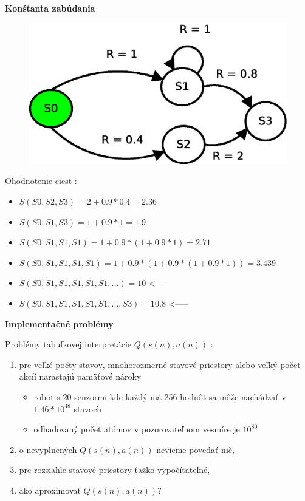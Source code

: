 \documentclass[xcolor=dvipsnames]{beamer}
\begin{document}
\begin{frame}{\bf Konštanta zabúdania }

  \begin{figure}[!htb]
  \centering
  \includegraphics[scale=.5]{../diagrams/rf_cycle_states.eps}
  \end{figure}

  Ohodnotenie ciest :
  \begin{itemize}
    \item $S(S0, S2, S3) = 2 + 0.9*0.4 = 2.36$
    \item $S(S0, S1, S3) = 1 + 0.9*1 = 1.9$
    \item $S(S0, S1, S1, S1) = 1 + 0.9*(1 + 0.9*1) = 2.71 $
    \item $S(S0, S1, S1, S1, S1) = 1 + 0.9*(1 + 0.9*(1 + 0.9*1)) = 3.439$
    \item $S(S0, S1, S1, S1, S1, S1, ...) = 10$ <-----
    \item $S(S0, S1, S1, S1, S1, S1, ..., S3) = 10.8$ <-----
  \end{itemize}

\end{frame}




\begin{frame}{\bf Implementačné problémy}

Problémy tabuľkovej interpretácie $Q(s(n), a(n))$ :

\begin{enumerate}
\item pre veľké počty stavov, mnohorozmerné stavové priestory alebo veľký počet akcíí narastajú pamäťové nároky
  \begin{itemize}
  \item robot s 20 senzormi kde každý má 256 hodnôt sa môže nachádzať v $1.46*10^{48}$ stavoch
  \item odhadovaný počet atómov v pozorovateľnom vesmíre je $10^{80}$
  \end{itemize}
\item o nevyplnených $Q(s(n), a(n))$ nevieme povedať nič,
\item pre rozsiahle stavové priestory ťažko vypočítateľné,
\item ako aproximovať $Q(s(n), a(n))$?
\end{enumerate}

\end{frame}
\end{document}

